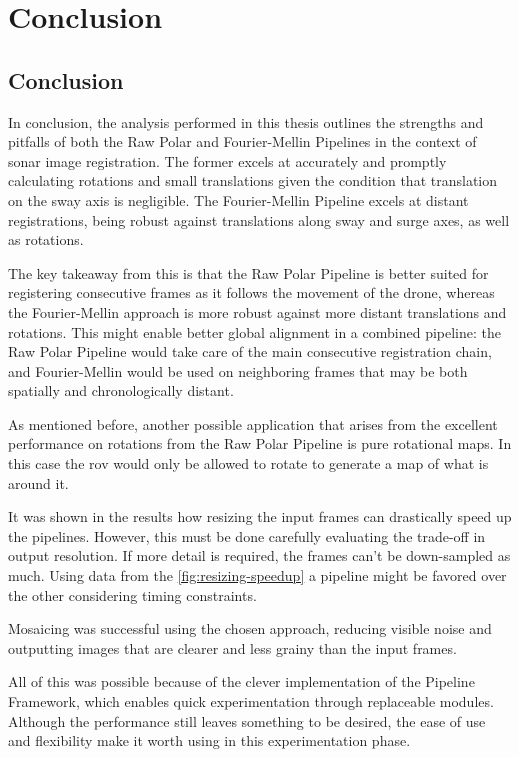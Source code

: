 \chapter{Conclusion}
\label{chap:conclusion}

\section{Conclusion}
In conclusion, the analysis performed in this thesis outlines the strengths and pitfalls of both the Raw Polar and Fourier-Mellin Pipelines in the context of sonar image registration. The former excels at accurately and promptly calculating rotations and small translations given the condition that translation on the sway axis is negligible. The Fourier-Mellin Pipeline excels at distant registrations, being robust against translations along sway and surge axes, as well as rotations. 

The key takeaway from this is that the Raw Polar Pipeline is better suited for registering consecutive frames as it follows the movement of the drone, whereas the Fourier-Mellin approach is more robust against more distant translations and rotations. This might enable better global alignment in a combined pipeline: the Raw Polar Pipeline would take care of the main consecutive registration chain, and Fourier-Mellin would be used on neighboring frames that may be both spatially and chronologically distant. 

As mentioned before, another possible application that arises from the excellent performance on rotations from the Raw Polar Pipeline is pure rotational maps. In this case the \acrshort{rov} would only be allowed to rotate to generate a map of what is around it.

It was shown in the results how resizing the input frames can drastically speed up the pipelines. However, this must be done carefully evaluating the trade-off in output resolution. If more detail is required, the frames can't be down-sampled as much. Using data from the \autoref{fig:resizing-speedup} a pipeline might be favored over the other considering timing constraints.

Mosaicing was successful using the chosen approach, reducing visible noise and outputting images that are clearer and less grainy than the input frames. 

All of this was possible because of the clever implementation of the Pipeline Framework, which enables quick experimentation through replaceable modules. Although the performance still leaves something to be desired, the ease of use and flexibility make it worth using in this experimentation phase.


